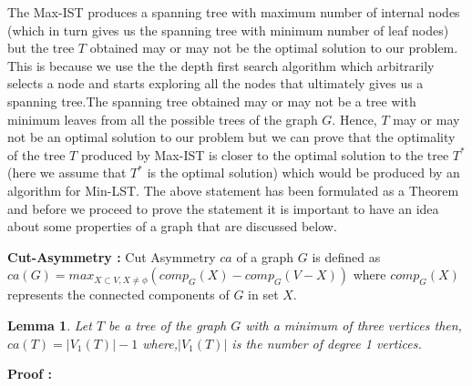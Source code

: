\documentclass[12pt]{article}
\newtheorem{lemma}{Lemma}
\theoremstyle{plain}
\begin{document}
 The Max-IST produces a spanning tree with maximum number of internal nodes (which in turn gives us the spanning tree with minimum number of leaf nodes) but the tree $T$ obtained may or may not be the optimal solution to our problem. This is because we use the the depth first search algorithm which arbitrarily selects a node and starts exploring all the nodes that ultimately gives us a spanning tree.The spanning tree obtained may or may not be a tree with minimum leaves from all the possible trees of the graph $G$. Hence, $T$ may or may not be an optimal solution to our problem but we can prove that the optimality of the tree $T$ produced by Max-IST is closer to the optimal solution to the tree $T^*$ (here we assume that $T^*$ is the optimal solution) which would be produced by an algorithm for Min-LST. The above statement has been formulated as a Theorem and before we proceed to prove the statement it is important to have an idea about some properties of a graph that are discussed below.

\textbf{Cut-Asymmetry :}
Cut Asymmetry $ca$ of a graph $G$ is defined as $ca(G)=max_{X \subset V, X \neq \phi } ( comp_G (X) - comp_G (V-X))$ where $comp_G (X)$ represents the connected components of $G$ in set $X$.

\begin{lemma}\label{le2}
Let $T$ be a tree of the graph $G$ with a minimum of three vertices then,
$ca(T)=|V_1(T)| -1$ where,$ |V_1(T)|$ is the number of degree 1 vertices.
\end{lemma}
\noindent
\textbf{Proof :}
\end{document}
